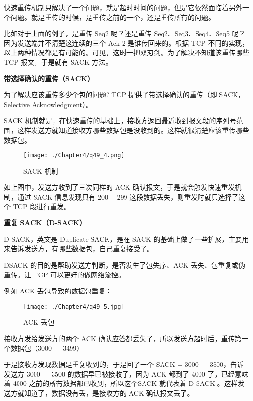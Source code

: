 \documentclass[cn,11pt,color=blue,lang=cn]{elegantbook}
\begin{document}
快速重传机制只解决了一个问题，就是超时时间的问题，但是它依然面临着另外⼀个问题。就是重传的时候，是重传之前的一个，还是重传所有的问题。

比如对于上面的例子，是重传 Seq2 呢？还是重传 Seq2、Seq3、Seq4、Seq5 呢？因为发送端并不清楚这连续的三个 Ack 2 是谁传回来的。根据 TCP 不同的实现，以上两种情况都是有可能的。可见，这时一把双刃剑。为了解决不知道该重传哪些 TCP 报文，于是就有 SACK 方法。

\begin{note} \textbf{带选择确认的重传（SACK）} \end{note}

为了解决应该重传多少个包的问题? TCP 提供了带选择确认的重传（即 SACK，Selective Acknowledgment）。

SACK 机制就是，在快速重传的基础上，接收方返回最近收到报文段的序列号范围，这样发送方就知道接收方哪些数据包是没收到的。这样就很清楚应该重传哪些数据包。
\begin{figure}[!h]
\centering
\texttt{[image: ./Chapter4/q49\_4.png]}
\caption{SACK 机制}
\label{fig49_4}
\end{figure}

如上图中，发送方收到了三次同样的 ACK 确认报文，于是就会触发快速重发机制，通过 SACK 信息发现只有 200— 299 这段数据丢失，则重发时就只选择了这个 TCP 段进行重发。

\begin{note} \textbf{重复 SACK（D-SACK）} \end{note}
D-SACK，英文是 Duplicate SACK，是在 SACK 的基础上做了一些扩展，主要用来告诉发送方，有哪些数据包，自己重复接受了。

DSACK 的目的是帮助发送方判断，是否发生了包失序、ACK 丢失、包重复或伪重传。让 TCP 可以更好的做网络流控。

例如 ACK 丢包导致的数据包重复：
\begin{figure}[!h]
\centering
\texttt{[image: ./Chapter4/q49\_5.jpg]}
\caption{ACK 丢包}
\label{fig49_5}
\end{figure}

接收方发给发送方的两个 ACK 确认应答都丢失了，所以发送方超时后，重传第一个数据包（3000 —
3499）

于是接收方发现数据是重复收到的，于是回了一个 SACK = 3000 — 3500，告诉发送方 3000 — 3500 的数据早已被接收了，因为 ACK 都到了 4000 了，已经意味着 4000 之前的所有数据都已收到，所以这个SACK 就代表着 D-SACK 。这样发送方就知道了，数据没有丢，是接收方的 ACK 确认报文丢了。
\end{document}
